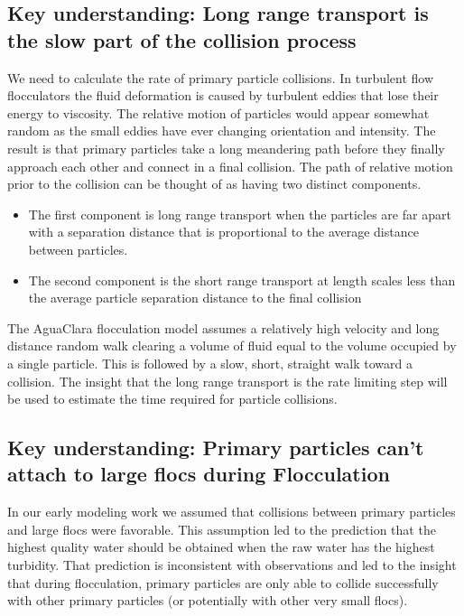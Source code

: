 \documentclass[letterpaper,10pt,english]{sphinxmanual}
\begin{document}
\subsection{Key understanding: Long range transport is the slow part of the collision process}
\label{\detokenize{Flocculation/Floc_Model:key-understanding-long-range-transport-is-the-slow-part-of-the-collision-process}}
We need to calculate the rate of primary particle collisions. In turbulent flow flocculators the fluid deformation is caused by turbulent eddies that lose their energy to viscosity. The relative motion of particles would appear somewhat random as the small eddies have ever changing orientation and intensity. The result is that primary particles take a long meandering path before they finally approach each other and connect in a final collision. The path of relative motion prior to the collision can be thought of as having two distinct components.
\begin{itemize}
\item {} 
The first component is long range transport when the particles are far apart with a separation distance that is proportional to the average distance between particles.

\item {} 
The second component is the short range transport at length scales less than the average particle separation distance to the final collision

\end{itemize}

The AguaClara flocculation model assumes a relatively high velocity and long distance random walk clearing a volume of fluid equal to the volume occupied by a single particle. This is followed by a slow, short, straight walk toward a collision. The insight that the long range transport is the rate limiting step will be used to estimate the time required for particle collisions.


\subsection{Key understanding: Primary particles can’t attach to large flocs during Flocculation}
\label{\detokenize{Flocculation/Floc_Model:key-understanding-primary-particles-can-t-attach-to-large-flocs-during-flocculation}}
In our early modeling work we assumed that collisions between primary particles and large flocs were favorable. This assumption led to the prediction that the highest quality water should be obtained when the raw water has the highest turbidity. That prediction is inconsistent with observations and led to the insight that during flocculation, primary particles are only able to collide successfully with other primary particles (or potentially with other very small flocs).
\end{document}
